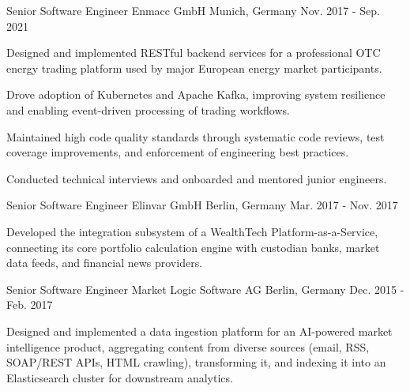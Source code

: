 \begin{cventries}
  \cventry
    {Senior Software Engineer} %
    {Enmacc GmbH} %
    {Munich, Germany} %
    {Nov. 2017 - Sep. 2021} %
    {
      \begin{cvitems} %
        \item {Designed and implemented RESTful backend services for a professional OTC energy trading platform used by major European energy market participants.}
        \item {Drove adoption of Kubernetes and Apache Kafka, improving system resilience and enabling event-driven processing of trading workflows.}
        \item {Maintained high code quality standards through systematic code reviews, test coverage improvements, and enforcement of engineering best practices.}
        \item {Conducted technical interviews and onboarded and mentored junior engineers.}
      \end{cvitems}
    }

  \cventry
    {Senior Software Engineer} %
    {Elinvar GmbH} %
    {Berlin, Germany} %
    {Mar. 2017 - Nov. 2017} %
    {
      \begin{cvitems} %
        \item {Developed the integration subsystem of a WealthTech Platform-as-a-Service, connecting its core portfolio calculation engine with custodian banks, market data feeds, and financial news providers.}
      \end{cvitems}
    }

  \cventry
    {Senior Software Engineer} %
    {Market Logic Software AG} %
    {Berlin, Germany} %
    {Dec. 2015 - Feb. 2017} %
    {
      \begin{cvitems} %
        \item {Designed and implemented a data ingestion platform for an AI-powered market intelligence product, aggregating content from diverse sources (email, RSS, SOAP/REST APIs, HTML crawling), transforming it, and indexing it into an Elasticsearch cluster for downstream analytics.}
      \end{cvitems}
    }


\end{cventries}
